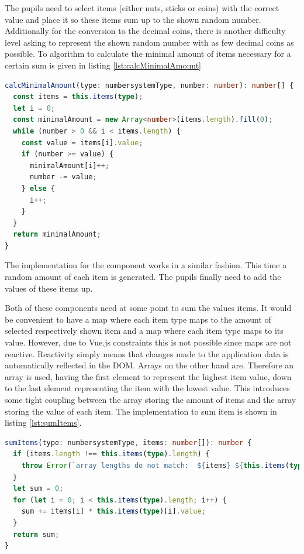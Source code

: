 The pupils need to select items (either nuts, sticks or coins) with the correct value and place it so these items sum up to the shown random number.
Additionally for the conversion to the decimal coins, there is another difficulty level asking to represent the shown random number with as few decimal coins as possible. To algorithm to calculate the minimal amount of items necessary for a certain sum is given in listing \ref{lst:calcMinimalAmount} 


\begin{lstlisting}[language=TypeScript,caption={Calculate minimal amount of items needed to reach a certain number},label={lst:calcMinimalAmount}]
calcMinimalAmount(type: numbersystemType, number: number): number[] {
  const items = this.items(type);
  let i = 0;
  const minimalAmount = new Array<number>(items.length).fill(0);
  while (number > 0 && i < items.length) {
    const value = items[i].value;
    if (number >= value) {
      minimalAmount[i]++;
      number -= value;
    } else {
      i++;
    }
  }
  return minimalAmount;
}
\end{lstlisting}

The implementation for the  component works in a similar fashion. This time a random amount of each item is generated. 
The pupils finally need to add the values of these items up.

Both of these components need at some point to sum the values items. It would be convenient to have a map where each item type maps to the amount of selected respectively shown item and a map where each item type maps to its value. However, due to Vue.js constraints this is not possible since maps are not reactive. Reactivity simply means that changes made to the application data is automatically reflected in the DOM.
Arrays on the other hand are. Therefore an array is used, having the first element to represent the highest item value, down to the last element representing the item with the lowest value. This introduces some tight coupling between the array storing the amount of items and the array storing the value of each item. The implementation to sum item is shown in listing \ref{lst:sumItems}.

\begin{lstlisting}[language=TypeScript,caption={Sum up items},label={lst:sumItems}]
sumItems(type: numbersystemType, items: number[]): number {
  if (items.length !== this.items(type).length) {
    throw Error(`array lengths do not match:  ${items} ${this.items(type)}`);
  }
  let sum = 0;
  for (let i = 0; i < this.items(type).length; i++) {
    sum += items[i] * this.items(type)[i].value;
  }
  return sum;
}
\end{lstlisting}

